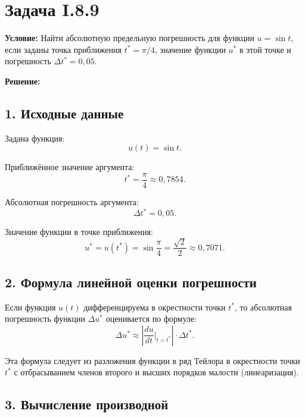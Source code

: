 \documentclass{article}
\begin{document}
\section*{Задача I.8.9}

\textbf{Условие:} Найти абсолютную предельную погрешность для функции $u = \sin t$, если заданы точка приближения $t^* = \pi/4$, значение функции $u^*$ в этой точке и погрешность $\Delta t^* = 0{,}05$.

\vspace{0.5cm}
\textbf{Решение:}

\subsection*{1. Исходные данные}

Задана функция:
\begin{equation}
u(t) = \sin t.
\end{equation}

Приближённое значение аргумента:
\begin{equation}
t^* = \frac{\pi}{4} \approx 0{,}7854.
\end{equation}

Абсолютная погрешность аргумента:
\begin{equation}
\Delta t^* = 0{,}05.
\end{equation}

Значение функции в точке приближения:
\begin{equation}
u^* = u(t^*) = \sin\frac{\pi}{4} = \frac{\sqrt{2}}{2} \approx 0{,}7071.
\end{equation}

\subsection*{2. Формула линейной оценки погрешности}

Если функция $u(t)$ дифференцируема в окрестности точки $t^*$, то абсолютная погрешность функции $\Delta u^*$ оценивается по формуле:
\begin{equation}
\Delta u^* \approx \left| \frac{du}{dt}\bigg|_{t = t^*} \right| \cdot \Delta t^*.
\label{eq:lin_err_89}
\end{equation}

Эта формула следует из разложения функции в ряд Тейлора в окрестности точки $t^*$ с отбрасыванием членов второго и высших порядков малости (линеаризация).

\subsection*{3. Вычисление производной}
\end{document}
